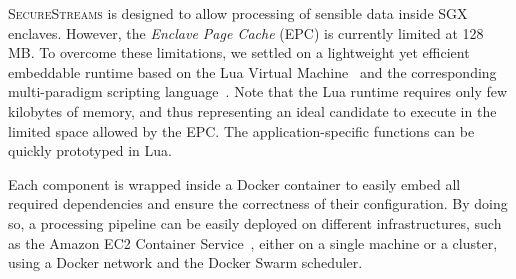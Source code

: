 \textsc{SecureStreams} is designed to allow processing of sensible data inside SGX enclaves.
However, the \emph{Enclave Page Cache} (EPC) is currently limited at 128\,MB.
To overcome these limitations, we settled on a lightweight yet efficient embeddable runtime based on the Lua Virtual Machine~\cite{ierusalimschy_luaextensible_1996} and the corresponding multi-paradigm scripting language~\cite{lualang}.
Note that the Lua runtime requires only few kilobytes of memory, and thus representing an ideal candidate to execute in the limited space allowed by the EPC.
The application-specific functions can be quickly prototyped in Lua.

Each component is wrapped inside a Docker container to easily embed all required dependencies and ensure the correctness of their configuration.
By doing so, a processing pipeline can be easily deployed on different infrastructures, such as the Amazon EC2 Container Service~\cite{awsec2container}, either on a single machine or a cluster, using a Docker network and the Docker Swarm\cite{docker:swarm_2016} scheduler.

